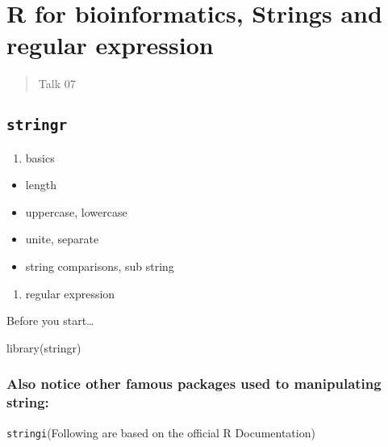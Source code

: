 \documentclass[
]{article}
\newenvironment{Shaded}{}{}
\newcommand{\FunctionTok}[1]{\textcolor[rgb]{0.02,0.16,0.49}{#1}}
\newcommand{\NormalTok}[1]{#1}
\begin{document}
\newpage
\hypertarget{r-for-bioinformatics-strings-and-regular-expression}{%
\section{R for bioinformatics, Strings and regular
expression}\label{r-for-bioinformatics-strings-and-regular-expression}}

\begin{quote}
Talk 07
\end{quote}

\hypertarget{stringr}{%
\subsection{\texorpdfstring{\texttt{stringr}}{stringr}}\label{stringr}}

\begin{enumerate}
\def\labelenumi{\arabic{enumi}.}
\item
  basics
\end{enumerate}

\begin{itemize}
\item
  length
\item
  uppercase, lowercase
\item
  unite, separate
\item
  string comparisons, sub string
\end{itemize}

\begin{enumerate}
\def\labelenumi{\arabic{enumi}.}
\item
  regular expression
\end{enumerate}

Before you start\ldots{}

\begin{Shaded}
\begin{Highlighting}[]
\FunctionTok{library}\NormalTok{(stringr)}
\end{Highlighting}
\end{Shaded}

\hypertarget{also-notice-other-famous-packages-used-to-manipulating-string}{%
\subsubsection{Also notice other famous packages used to manipulating
string:}\label{also-notice-other-famous-packages-used-to-manipulating-string}}

\texttt{stringi}(Following are based on the official R Documentation)
\end{document}
